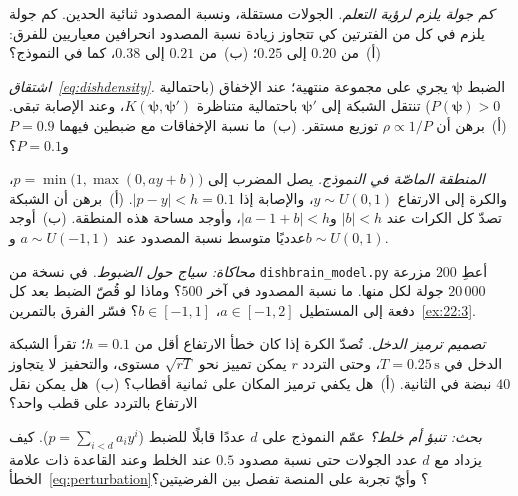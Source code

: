 \begin{exercise}[\lvlA]
\label{ex:22:2}
\emph{كم جولة يلزم لرؤية التعلم.} الجولات مستقلة، ونسبة المصدود ثنائية الحدين. كم جولة يلزم في كل من الفترتين كي تتجاوز زيادة نسبة المصدود انحرافين معياريين للفرق: (أ)~من $0.20$ إلى $0.25$؛ (ب)~من $0.21$ إلى $0.38$، كما في النموذج؟
\end{exercise}

\begin{exercise}[\lvlB]
\label{ex:22:3}
\emph{اشتقاق~\eqref{eq:dishdensity}.} الضبط $\boldsymbol\psi$ يجري على مجموعة منتهية؛ عند الإخفاق (باحتمالية $P(\boldsymbol\psi)>0$) تنتقل الشبكة إلى $\boldsymbol\psi'$ باحتمالية متناظرة $K(\boldsymbol\psi,\boldsymbol\psi')$، وعند الإصابة تبقى. (أ)~برهن أن $\rho\propto1/P$ توزيع مستقر. (ب)~ما نسبة الإخفاقات مع ضبطين فيهما $P=0.9$ و$P=0.1$؟
\end{exercise}

\begin{exercise}[\lvlB]
\label{ex:22:4}
\emph{المنطقة الماصّة في النموذج.} يصل المضرب إلى $p=\min\bigl(1,\max(0,ay+b)\bigr)$، والكرة إلى الارتفاع $y\sim U(0,1)$، والإصابة إذا $|p-y|<h=0.1$. (أ)~برهن أن الشبكة تصدّ كل الكرات عند $|b|<h$ و$|a-1+b|<h$، وأوجد مساحة هذه المنطقة. (ب)~أوجد عدديًا متوسط نسبة المصدود عند $a\sim U(-1,1)$ و$b\sim U(0,1)$.
\end{exercise}

\begin{exercise}[\lvlB]
\label{ex:22:5}
\emph{محاكاة: سياج حول الضبوط.} في نسخة من \foreignlanguage{english}{\texttt{dishbrain\_model.py}} أعطِ $200$ مزرعة $20\,000$ جولة لكل منها. ما نسبة المصدود في آخر $500$؟ وماذا لو قُصّ الضبط بعد كل دفعة إلى المستطيل $a\in[-1,2]$، $b\in[-1,1]$؟ فسّر الفرق بالتمرين~\ref{ex:22:3}.
\end{exercise}

\begin{exercise}[\lvlB]
\label{ex:22:6}
\emph{تصميم ترميز الدخل.} تُصدّ الكرة إذا كان خطأ الارتفاع أقل من $h=0.1$؛ تقرأ الشبكة الدخل في $T=0.25\,\text{s}$، وحتى التردد $r$ يمكن تمييز نحو $\sqrt{rT}$ مستوى، والتحفيز لا يتجاوز $40$ نبضة في الثانية. (أ)~هل يكفي ترميز المكان على ثمانية أقطاب؟ (ب)~هل يمكن نقل الارتفاع بالتردد على قطب واحد؟
\end{exercise}

\begin{exercise}[\lvlC]
\label{ex:22:7}
\emph{بحث: تنبؤ أم خلط؟} عمّم النموذج على $d$ عددًا قابلًا للضبط ($p=\sum_{i<d}a_iy^i$). كيف يزداد مع $d$ عدد الجولات حتى نسبة مصدود $0.5$ عند الخلط وعند القاعدة ذات علامة الخطأ~\eqref{eq:perturbation}؟ وأيّ تجربة على المنصة تفصل بين الفرضيتين؟
\end{exercise}
